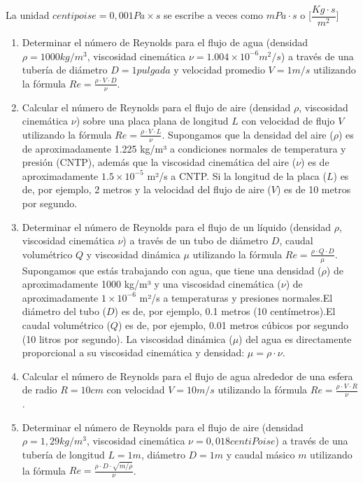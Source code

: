 \documentclass[../main]{subfiles}
\begin{document}
La unidad $centipoise = 0,001 Pa \times s$ se escribe a veces como $mPa \cdot s$ o [$\dfrac{Kg \cdot s }{m^2}$]


\begin{enumerate}
     \item Determinar el número de Reynolds para el flujo de agua (densidad $\rho=1000kg/m^3$, viscosidad cinemática $\nu=1.004 \times 10^{-6} m^2/s$) a través de una tubería de diámetro $D=1pulgada$ y velocidad promedio $V=1m/s$ utilizando la fórmula $Re = \frac{\rho \cdot V \cdot D}{\nu}$.

  \item Calcular el número de Reynolds para el flujo de aire (densidad $\rho$, viscosidad cinemática $\nu$) sobre una placa plana de longitud $L$ con velocidad de flujo $V$ utilizando la fórmula $Re = \frac{\rho \cdot V \cdot L}{\nu}$. Supongamos que la densidad del aire ($\rho$) es de aproximadamente 1.225 kg/m³ a condiciones normales de temperatura y presión (CNTP), además que la viscosidad cinemática del aire ($\nu$) es de aproximadamente $1.5 \times 10^{-5}$ m²/s a CNTP. Si la longitud de la placa ($L$) es de, por ejemplo, 2 metros y la velocidad del flujo de aire ($V$) es de 10 metros por segundo.


  \item Determinar el número de Reynolds para el flujo de un líquido (densidad $\rho$, viscosidad cinemática $\nu$) a través de un tubo de diámetro $D$, caudal volumétrico $Q$ y viscosidad dinámica $\mu$ utilizando la fórmula $Re = \frac{\rho \cdot Q \cdot D}{\mu}$. Supongamos que estás trabajando con agua, que tiene una densidad ($\rho$) de aproximadamente 1000 kg/m³ y una viscosidad cinemática ($\nu$) de aproximadamente $1 \times 10^{-6}$ m²/s a temperaturas y presiones normales.El diámetro del tubo ($D$) es de, por ejemplo, 0.1 metros (10 centímetros).El caudal volumétrico ($Q$) es de, por ejemplo, 0.01 metros cúbicos por segundo (10 litros por segundo). La viscosidad dinámica ($\mu$) del agua es directamente proporcional a su viscosidad cinemática y densidad: $\mu = \rho \cdot \nu$.

  \item Calcular el número de Reynolds para el flujo de agua alrededor de una esfera de radio $R=10cm$ con velocidad $V=10m/s$ utilizando la fórmula $Re = \frac{\rho \cdot V \cdot R}{\nu}$.

  \item Determinar el número de Reynolds para el flujo de aire (densidad $\rho=1,29kg/m^3$, viscosidad cinemática $\nu=0,018 centiPoise$) a través de una tubería de longitud $L=1m$, diámetro $D=1m$ y caudal másico $m$ utilizando la fórmula $Re = \frac{\rho \cdot D \cdot \sqrt{m/\rho}}{\nu}$.


\end{enumerate}
\end{document}
